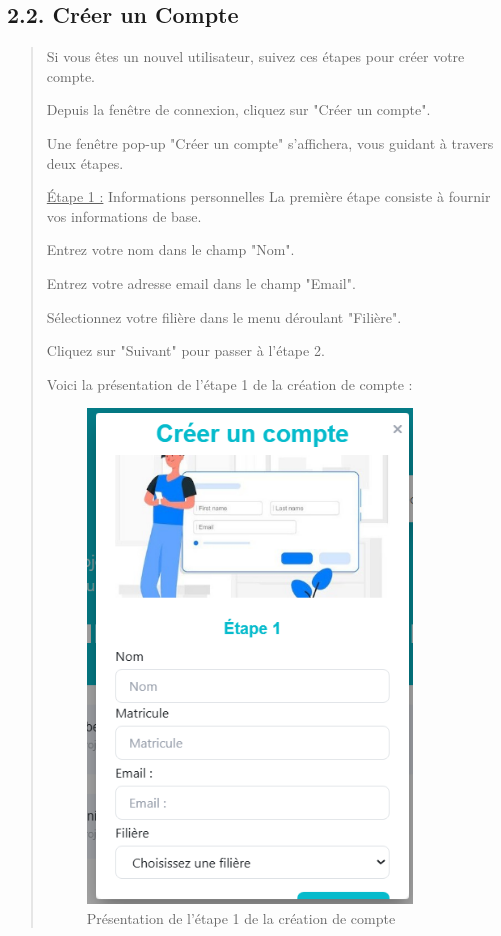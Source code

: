 \documentclass[a4paper,12pt]{article}
\begin{document}
\subsection*{2.2. Créer un Compte}
\begin{quote}
Si vous êtes un nouvel utilisateur, suivez ces étapes pour créer votre compte.

Depuis la fenêtre de connexion, cliquez sur "Créer un compte".

Une fenêtre pop-up "Créer un compte" s'affichera, vous guidant à travers deux étapes.

\underline{Étape 1 :} Informations personnelles La première étape consiste à fournir vos informations de base.

Entrez votre nom dans le champ "Nom".

Entrez votre adresse email dans le champ "Email".

Sélectionnez votre filière dans le menu déroulant "Filière".

Cliquez sur "Suivant" pour passer à l'étape 2.

Voici la présentation de l'étape 1 de la création de compte :

\begin{figure}[H]
\centering
\includegraphics[width=0.85\textwidth]{IMAGES/creercompte1.png}
\caption{Présentation de l'étape 1 de la création de compte}
\label{fig:etape1}
\end{figure}


\end{quote}
\end{document}
